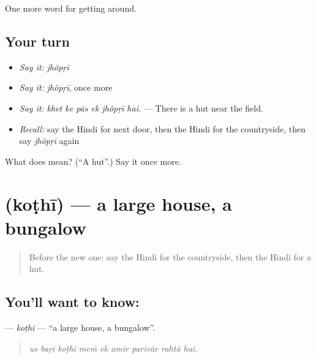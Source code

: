 \begin{grammarlens}[title={What you've built}]
One more word for getting around.
\end{grammarlens}

\subsection*{Your turn}
\begin{itemize}
\raggedright
  \item \emph{Say it:} \emph{jhõpṛī}
  \item \emph{Say it:} \emph{jhõpṛī}, once more
  \item \emph{Say it:} \emph{khet ke pās ek jhõpṛī hai.} — There is a hut near the field.
  \item \emph{Recall:} say the Hindi for next door, then the Hindi for the countryside, then say \emph{jhõpṛī} again
\end{itemize}

\begin{tcolorbox}[breakable,colback=teal!4,colframe=teal!35!black,title={Before you move on}]
What does  mean? (\textquotedblleft{}A hut\textquotedblright{}.) Say it once more.
\end{tcolorbox}
\section[\texorpdfstring{\hi{कोठी} (koṭhī)}{कोठी (koṭhī)}]{ (koṭhī) — a large house, a bungalow}

\label{lesson:HI-C422-kothi}



\begin{quote}
Before the new one: say the Hindi for the countryside, then the Hindi for a hut.
\end{quote}

\subsection*{You'll want to know: }
\textbf{} — \emph{koṭhī} — \textquotedblleft{}a large house, a bungalow\textquotedblright{}.

\begin{quote}
        
\end{quote}

\begin{quote}
\emph{us baṛī koṭhī meṁ ek amīr parivār rahtā hai.}
\end{quote}

